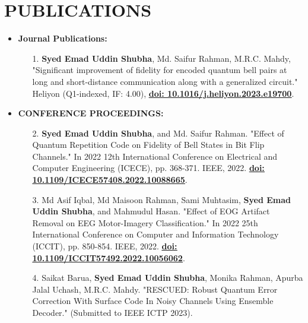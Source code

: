 \documentclass[letterpaper,11pt]{article}
\begin{document}
\section*{\textbf{PUBLICATIONS}}
\begin{itemize}[left=0cm]
\fontsize{9.6}{11.2}\selectfont
\item \textbf{Journal Publications:}
\vspace{-0.5em} %
\begin{itemize}[left=0cm]
       \item [1.] \textbf{Syed Emad Uddin Shubha}, Md. Saifur Rahman, M.R.C. Mahdy, "Significant improvement of fidelity for encoded quantum bell pairs at long and short-distance communication along with a generalized circuit." Heliyon (Q1-indexed, IF: 4.00),  \href{https://www.sciencedirect.com/science/article/pii/S2405844023069086}{\underline{\textbf{doi: 10.1016/j.heliyon.2023.e19700}}}.
    \end{itemize}
    \end{itemize}
\begin{itemize}[left=0cm]
\fontsize{9.6}{11.2}\selectfont
\item \textbf{CONFERENCE PROCEEDINGS:}
\vspace{-0.5em} %
    \begin{itemize}[left=0cm]
        \item [2.] \textbf{Syed Emad Uddin Shubha}, and Md. Saifur Rahman. "Effect of Quantum Repetition Code on Fidelity of Bell States in Bit Flip Channels." In 2022 12th International Conference on Electrical and Computer Engineering (ICECE), pp. 368-371. IEEE, 2022.          \href{https://doi.org/10.1109/ICECE57408.2022.10088665}{\underline{\textbf{doi: 10.1109/ICECE57408.2022.10088665}}}. 
          
        \item [3.] Md Asif Iqbal, Md Maisoon Rahman, Sami Muhtasim, \textbf{Syed Emad Uddin Shubha}, and Mahmudul Hasan. "Effect of EOG Artifact Removal on EEG Motor-Imagery Classification." In 2022 25th International Conference on Computer and Information Technology (ICCIT), pp. 850-854. IEEE, 2022.          \href{https://doi.org/10.1109/ICCIT57492.2022.10056062}{\underline{\textbf{doi: 10.1109/ICCIT57492.2022.10056062}}}.
      \item [4.] Saikat Barua, \textbf{Syed Emad Uddin Shubha}, Monika Rahman, Apurba Jalal Uchash, M.R.C. Mahdy. "RESCUED: Robust Quantum Error Correction With Surface Code In Noisy Channels Using Ensemble Decoder." (Submitted to IEEE ICTP 2023).
    \end{itemize}
    \end{itemize}
\end{document}
